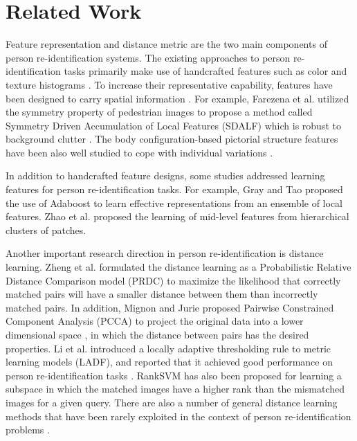 \documentclass[review]{elsarticle}
\begin{document}
\section{Related Work}

Feature representation and distance metric are the two main components of person re-identification systems. The existing approaches to person re-identification tasks primarily make use of handcrafted features such as color and texture histograms \cite{gray2008viewpoint, wang2007shape, lin2012representing}. To increase their representative capability, features have been designed to carry spatial information \cite{gray2008viewpoint, farenzena2010person}. For example, Farezena et al. utilized the symmetry property of pedestrian images to propose a method called Symmetry Driven Accumulation of Local Features (SDALF) which is robust to background clutter \cite{farenzena2010person}.  The body configuration-based pictorial structure features have been also well studied to cope with individual variations \cite{lin2015AOGraph,xu2013human}. 

In addition to handcrafted feature designs, some studies addressed learning features for person re-identification tasks. For example, Gray and Tao \cite{gray2008viewpoint} proposed the use of Adaboost to learn effective representations from an ensemble of local features. Zhao et al.  \cite{zhao2013learning} proposed the learning of mid-level features from hierarchical clusters of patches.

Another important research direction in person re-identification is distance learning. Zheng et al. \cite{zheng2011person} formulated the distance learning as a Probabilistic Relative Distance Comparison model (PRDC) to maximize the likelihood that correctly matched pairs will have a smaller distance between them than incorrectly matched pairs. In addition, Mignon and Jurie proposed Pairwise Constrained Component Analysis (PCCA) to project the original data into a lower dimensional space \cite{mignon2012pcca}, in which the distance between pairs has the desired properties. Li et al. introduced a locally adaptive thresholding rule to metric learning models (LADF), and reported that it achieved good performance on person re-identification tasks \cite{li2013learning}. RankSVM has also  been proposed for learning a subspace in which the matched images have a higher rank than the mismatched images for a given query. There are also a number of general distance learning methods that have been rarely exploited in the context of person re-identification problems \cite{xing2002distance, weinberger2005distance, davis2007information, xiang2008learning}.
\end{document}
